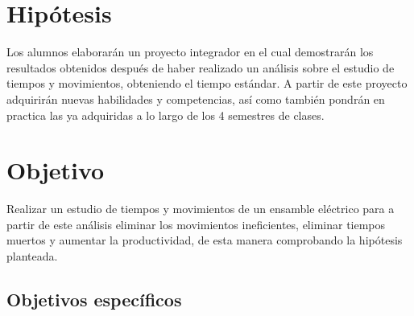 \begin{itemize}
    \section{Hipótesis}
    
    Los alumnos elaborarán un proyecto integrador en el cual demostrarán los resultados obtenidos después de haber realizado un  análisis sobre el estudio de tiempos y movimientos, obteniendo el tiempo estándar. A partir de este proyecto adquirirán nuevas habilidades y competencias, así como también pondrán en practica las ya adquiridas a lo largo de los 4 semestres de clases.
    \section{Objetivo}
    
    Realizar un estudio de tiempos y movimientos de un ensamble eléctrico para a partir de este análisis eliminar los movimientos ineficientes, eliminar tiempos muertos y aumentar la productividad, de esta manera comprobando la hipótesis planteada.
    
    
    \subsection{Objetivos específicos }
    

\end{itemize}
